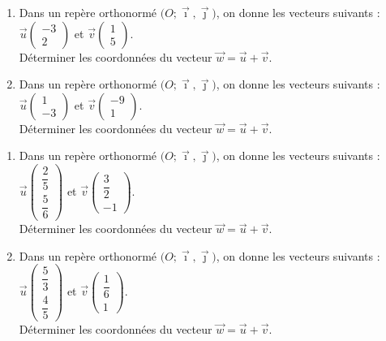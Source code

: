 \documentclass[11pt]{article}
\begin{document}
\begin{exercice}[1]

\begin{enumerate}[itemsep=1em]
\item Dans un repère orthonormé $\big(O ; \vec \imath,\vec \jmath\big)$, on donne les vecteurs suivants : $\vec{u}\begin{pmatrix}-3\\2\end{pmatrix}$ et $\vec{v}\begin{pmatrix}1\\5\end{pmatrix}$.\\Déterminer les coordonnées du vecteur $\overrightarrow{w}=\overrightarrow{u}+\overrightarrow{v}$.
\item Dans un repère orthonormé $\big(O ; \vec \imath,\vec \jmath\big)$, on donne les vecteurs suivants : $\vec{u}\begin{pmatrix}1\\-3\end{pmatrix}$ et $\vec{v}\begin{pmatrix}-9\\1\end{pmatrix}$.\\Déterminer les coordonnées du vecteur $\overrightarrow{w}=\overrightarrow{u}+\overrightarrow{v}$.
\end{enumerate}
\end{exercice}

\begin{exercice}[1]

\begin{enumerate}[itemsep=1em]
\item Dans un repère orthonormé $\big(O ; \vec \imath,\vec \jmath\big)$, on donne les vecteurs suivants : $\vec{u}\begin{pmatrix}\dfrac{2}{5}\\[0.7em]\dfrac{5}{6}\end{pmatrix}$ et $\vec{v}\begin{pmatrix}\dfrac{3}{2}\\[0.7em]-1\end{pmatrix}$.\\Déterminer les coordonnées du vecteur $\overrightarrow{w}=\overrightarrow{u}+\overrightarrow{v}$.
\item Dans un repère orthonormé $\big(O ; \vec \imath,\vec \jmath\big)$, on donne les vecteurs suivants : $\vec{u}\begin{pmatrix}\dfrac{5}{3}\\[0.7em]\dfrac{4}{5}\end{pmatrix}$ et $\vec{v}\begin{pmatrix}\dfrac{1}{6}\\[0.7em]1\end{pmatrix}$.\\Déterminer les coordonnées du vecteur $\overrightarrow{w}=\overrightarrow{u}+\overrightarrow{v}$.
\end{enumerate}
\end{exercice}
\end{document}
